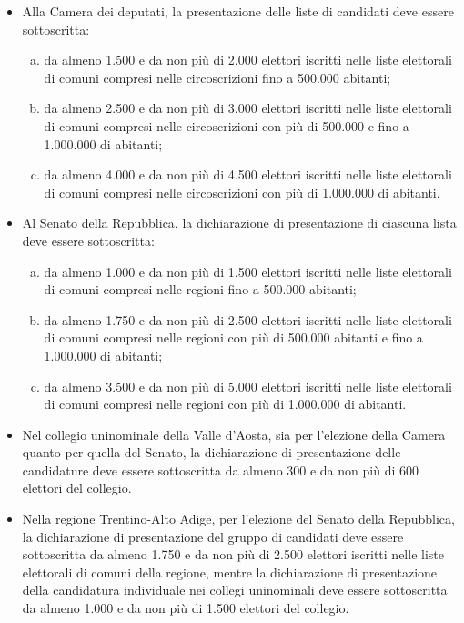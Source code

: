 \documentclass[paper=a4,11pt]{scrartcl}
\begin{document}
\begin{itemize}
\item Alla Camera dei deputati, la presentazione delle liste di candidati deve 
essere sottoscritta:
\begin{enumerate}[a)]
\item da almeno 1.500 e da non più di 2.000 elettori iscritti nelle liste 
elettorali di comuni compresi nelle circoscrizioni fino a 500.000 abitanti;
\item da almeno 2.500 e da non più di 3.000 elettori iscritti nelle liste 
elettorali di comuni compresi nelle circoscrizioni con più di 500.000 e fino a 
1.000.000 di abitanti;
\item da almeno 4.000 e da non più di 4.500 elettori iscritti nelle liste 
elettorali di comuni compresi nelle circoscrizioni con più di 1.000.000 di 
abitanti.\end{enumerate}

\item Al Senato della Repubblica, la dichiarazione di presentazione di ciascuna 
lista deve essere sottoscritta:
\begin{enumerate}[a)]
\item da almeno 1.000 e da non più di 1.500 elettori iscritti nelle liste 
elettorali di comuni compresi nelle regioni fino a 500.000 abitanti;
\item da almeno 1.750 e da non più di 2.500 elettori iscritti nelle liste 
elettorali di comuni compresi nelle regioni con più di 500.000 abitanti e fino 
a 1.000.000 di abitanti;
\item da almeno 3.500 e da non più di 5.000 elettori iscritti nelle liste 
elettorali di comuni compresi nelle regioni con più di 1.000.000 di abitanti.\end{enumerate}

\item Nel collegio uninominale della Valle d’Aosta, sia per l’elezione della Camera 
quanto per quella del Senato, la dichiarazione di presentazione delle 
candidature deve essere sottoscritta da almeno 300 e da non più di 600 elettori 
del collegio.

\item Nella regione Trentino-Alto Adige, per l’elezione del Senato della Repubblica, 
la dichiarazione di presentazione del gruppo di candidati deve essere 
sottoscritta da almeno 1.750 e da non più di 2.500 elettori iscritti nelle 
liste elettorali di comuni della regione, mentre la dichiarazione di 
presentazione della candidatura individuale nei collegi uninominali deve essere 
sottoscritta da almeno 1.000 e da non più di 1.500 elettori del collegio.
\end{itemize}
\end{document}
